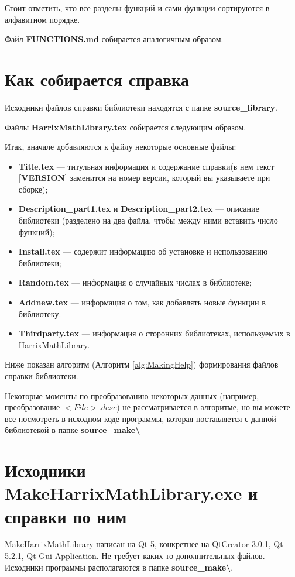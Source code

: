 \documentclass[a4paper,12pt]{article}
\begin{document}
Стоит отметить, что все разделы функций и сами функции сортируются в алфавитном порядке.

Файл \textbf{FUNCTIONS.md} собирается аналогичным образом.


\section{Как собирается справка}
Исходники файлов справки библиотеки находятся с папке
\textbf{source\_library}.

Файлы \textbf{HarrixMathLibrary.tex} собирается следующим образом.

Итак, вначале добавляются к файлу некоторые основные файлы:

\begin{itemize}
\item \textbf{Title.tex} --- титульная информация и содержание справки(в нем текст \textbf{[VERSION}] заменится на номер версии, который вы указываете при сборке);
\item \textbf{Description\_part1.tex} и \textbf{Description\_part2.tex} --- описание библиотеки (разделено на два файла, чтобы между ними вставить число функций);
\item \textbf{Install.tex} --- содержит информацию об установке и использованию библиотеки;
\item \textbf{Random.tex} --- информация о случайных числах в библиотеке;
\item \textbf{Addnew.tex} --- информация о том, как добавлять новые функции в библиотеку.
\item \textbf{Thirdparty.tex} --- информация о сторонних библиотеках, используемых в HarrixMathLibrary.
\end{itemize}

Ниже показан алгоритм (Алгоритм \ref{alg:MakingHelp}) формирования файлов справки библиотеки.

Некоторые моменты по преобразованию некоторых данных (например, преобразование $<File>.desc$) не рассматривается в алгоритме, но вы можете все посмотреть в исходном коде программы, которая поставляется с данной библиотекой в папке \textbf{source\_make\textbackslash}

\section{Исходники MakeHarrixMathLibrary.exe и справки по ним}

MakeHarrixMathLibrary написан на Qt 5, конкретнее на QtCreator 3.0.1, Qt 5.2.1, Qt Gui Application.  Не требует каких-то дополнительных файлов. Исходники программы располагаются в папке \textbf{source\_make\textbackslash}.
\end{document}
